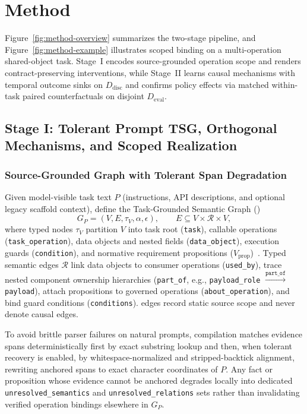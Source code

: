 \section{Method}
\label{sec:method}

Figure~\ref{fig:method-overview} summarizes the two-stage \model pipeline, and
Figure~\ref{fig:method-example} illustrates scoped binding on a multi-operation
shared-object task. Stage~I encodes source-grounded operation scope and renders
contract-preserving interventions, while Stage~II learns causal mechanisms with
temporal outcome sinks on $D_{\mathrm{disc}}$ and confirms policy effects via
matched within-task paired counterfactuals on disjoint $D_{\mathrm{eval}}$.

\subsection{Stage I: Tolerant Prompt TSG, Orthogonal Mechanisms, and Scoped Realization}
\label{sec:method-tsg}

\subsubsection{Source-Grounded Graph with Tolerant Span Degradation}
Given model-visible task text $P$ (instructions, API descriptions, and optional
legacy scaffold context), define the Task-Grounded Semantic Graph (\prompttsg)
\begin{equation}
  G_P = (V, E, \tau_V, \alpha, \epsilon),
  \qquad E \subseteq V \times \mathcal{R} \times V,
  \label{eq:source-graph}
\end{equation}
where typed nodes $\tau_V$ partition $V$ into task root (\texttt{task}),
callable operations (\texttt{task\_operation}), data objects and nested fields
(\texttt{data\_object}), execution guards (\texttt{condition}), and normative
requirement propositions ($V_{\mathrm{prop}}$)~\cite{banarescu2013amr}. Typed
semantic edges $\mathcal{R}$ link data objects to consumer operations
(\texttt{used\_by}), trace nested component ownership hierarchies
(\texttt{part\_of}, e.g., \texttt{payload\_role} $\xrightarrow{\texttt{part\_of}}$
\texttt{payload}), attach propositions to governed operations
(\texttt{about\_operation}), and bind guard conditions (\texttt{conditions}).
\prompttsg edges record static source scope and never denote causal edges.

To avoid brittle parser failures on natural prompts, compilation matches
evidence spans deterministically first by exact substring lookup and then, when
tolerant recovery is enabled, by whitespace-normalized and stripped-backtick
alignment, rewriting anchored spans to exact character coordinates of $P$.
Any fact or proposition whose evidence cannot be anchored degrades locally into
dedicated \texttt{unresolved\_semantics} and \texttt{unresolved\_relations} sets
rather than invalidating verified operation bindings elsewhere in $G_P$.

